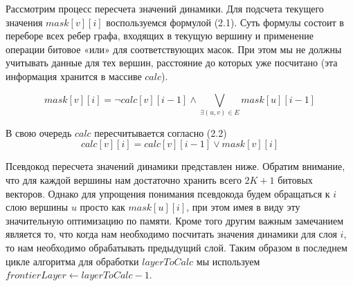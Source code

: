  Рассмотрим процесс пересчета значений динамики. Для подсчета текущего значения $mask[v][i]$ воспользуемся формулой (2.1). Суть формулы состоит в переборе всех ребер графа, входящих в текущую вершину и применение операции битовое «или» для соответствующих масок. При этом мы не должны учитывать данные для тех вершин, расстояние до которых уже посчитано (эта информация хранится в массиве $calc$).  
  

\FloatBarrier
\begin{equation}
mask[v][i] = \neg calc[v][i - 1] \wedge \bigvee_{\exists (u, v) \in E} mask[u][i - 1] 
\end{equation}
\FloatBarrier

В свою очередь $calc$ пересчитывается согласно (2.2)
\FloatBarrier
\begin{equation}
calc[v][i] = calc[v][i - 1] \vee mask[v][i]
\end{equation}
\FloatBarrier

Псевдокод пересчета значений динамики представлен ниже. Обратим внимание, что для каждой вершины нам достаточно хранить всего $2K + 1$ битовых векторов. Однако для упрощения понимания псевдокода будем обращаться к $i$ слою вершины $u$ просто как $mask[u][i]$, при этом имея в виду эту значительную оптимизацию по памяти. Кроме того другим важным замечанием является то, что когда нам необходимо посчитать значения динамики для слоя $i$, то нам необходимо обрабатывать предыдущий слой. Таким образом в последнем цикле алгоритма для обработки $layerToCalc$ мы используем $frontierLayer \gets layerToCalc - 1$.


